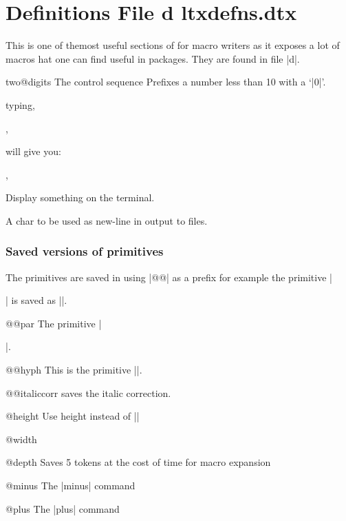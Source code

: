 \chapter{Definitions File d ltxdefns.dtx}
This is one of themost useful sections of \latex for macro writers as it exposes a lot of macros hat one can find useful in packages. They are found in file |d|.

\begin{docCommand} { two@digits} { }
The control sequence\cmd{\two@digits} Prefixes a number less than 10 with a `|0|'.
\end{docCommand}
typing,
\begin{teX}
,
\end{teX}

will give you:

\makeatletter
{},
\makeatother


 Display something on the terminal.

\begin{teX}
 \def\typeout#1{\begingroup\set@display@protect
 \immediate\write\@unused{#1}\endgroup}
\end{teX}

 A char to be used as new-line in output to files.



\subsection{Saved versions of primitives}

The \tex primitives are saved in \latex using |@@| as a prefix for example the \tex primitive |\par| is saved as |\@@par|.

\begin{trivlist}

\item @@par The \tex primitive |\par|.

\item @@hyph This is the \tex primitive |\-|.

\item @@italiccorr saves the italic correction.

\item @height Use height instead of |\height|

\item  @width

\item  @depth Saves 5 tokens at the cost of time for macro expansion

\item @minus The |minus| command

\item  @plus The |plus| command
\end{trivlist}


